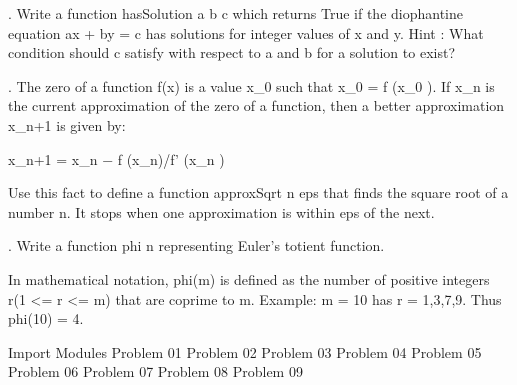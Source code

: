 \documentclass{article}%
\begin{document}
\nwendcode{}.  Write a function hasSolution a b  c  which  returns  True  if  the
diophantine equation ax + by = c has solutions for integer values of x
and y. Hint : What condition should  c satisfy with respect to a and b
for a solution to exist?

\nwenddocs{}\endmoddef\nwstartdeflinemarkup\nwenddeflinemarkup

\nwendcode{}.  The zero of a function f(x) is a value x_0 such that x_0 = f  (x_0
). If x_n is the current approximation of the zero of a function, then
a better  approximation x_{n+1} is  given by:

               x_{n+1}  = x_n −  f (x_n)/f' (x_n )

Use this fact to define a function approxSqrt n  eps  that  finds  the
square root of a number n.  It stops when one approximation is  within
eps of the next.

\nwenddocs{}\endmoddef\nwstartdeflinemarkup\nwenddeflinemarkup

\nwendcode{}.  Write a function phi  n  representing  Euler’s  totient  function.

In mathematical notation, phi(m) is defined as the number of  positive
integers r(1 <= r <= m) that are coprime to m.  Example: m = 10 has  r
= 1,3,7,9.  Thus phi(10) = 4.
\nwenddocs{}\endmoddef\nwstartdeflinemarkup\nwenddeflinemarkup

\nwendcode{}\nwdocspar

\nwenddocs{}\moddef{*}\endmoddef\nwstartdeflinemarkup\nwenddeflinemarkup
\LA{}Import Modules\RA{} 
\LA{}Problem 01\RA{} 
\LA{}Problem 02\RA{} 
\LA{}Problem 03\RA{} 
\LA{}Problem 04\RA{} 
\LA{}Problem 05\RA{} 
\LA{}Problem 06\RA{} 
\LA{}Problem 07\RA{} 
\LA{}Problem 08\RA{} 
\LA{}Problem 09\RA{} 
\nwendcode{}\nwdocspar
\end{document}
